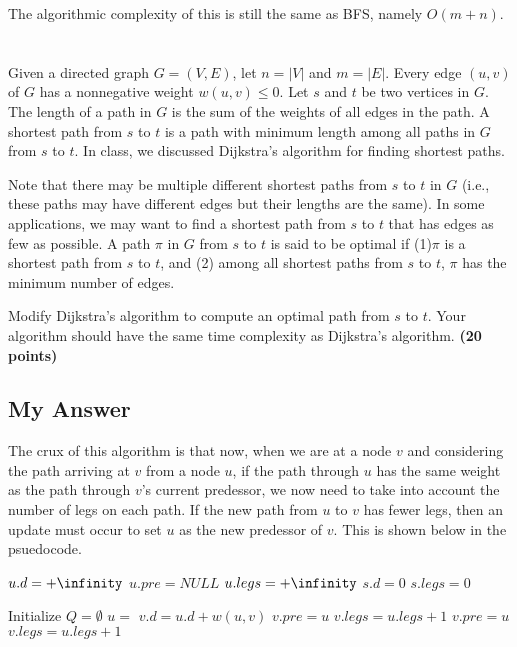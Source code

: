\documentclass{article}
\begin{document}
The algorithmic complexity of this is still the same as BFS, namely
$O(m+n)$. 




\section{}%

 Given a directed graph $G = (V,E)$, let $n = |V |$ and $m =
 |E|$. Every edge $(u,v)$ of $G$ has a nonnegative weight $w(u,v) \le
 0$. Let $s$ and $t$ be two vertices in $G$. The length of a path in
 $G$ is the sum of the weights of all edges in the path. A shortest
 path from $s$ to $t$ is a path with minimum length among all paths in
 $G$ from $s$ to $t$. In class, we discussed Dijkstra's algorithm for
 finding shortest paths. 

Note that there may be multiple different shortest paths from $s$ to
$t$ in $G$ (i.e., these paths may have different edges but their
lengths are the same). In some applications, we may want to find a
shortest path from $s$ to $t$ that has edges as few as possible. A
path $\pi$ in $G$ from $s$ to $t$ is said to be optimal if (1)$\pi$
is a shortest path from $s$ to $t$, and (2) among all shortest paths
from $s$ to $t$, $\pi$ has the minimum number of edges. 

Modify Dijkstra's algorithm to compute an optimal path from $s$ to
$t$. Your algorithm should have the same time complexity as Dijkstra's
algorithm. {\bf (20 points)}

\subsection{My Answer}

The crux of this algorithm is that now, when we are at a node $v$ and
considering the path arriving at $v$ from a node $u$, if the path
through $u$ has the same weight as the path through $v$'s current
predessor, we now need to take into account the number of legs on each
path.  If the new path from $u$ to $v$ has fewer legs, then an update
must occur to set $u$ as the new predessor of $v$.  This is shown
below in the psuedocode.

{\singlespacing
\begin{algorithmic}
      \State $u.d = +\infinity$
      \State $u.pre = NULL$
      \State $u.legs = +\infinity$
    \EndFor
    \State $s.d = 0$
    \State $s.legs = 0$

    \State Initialize $Q = \emptyset$
        \State $u = $ 
            \State $v.d = u.d + w(u,v)$
            \State $v.pre = u$
            \State $v.legs = u.legs + 1$
              \State $v.pre = u$
              \State $v.legs = u.legs + 1$
            \EndIf
          \EndIf  
        \EndFor
    \EndWhile
\EndFunction    
\end{algorithmic}
}
\end{document}
